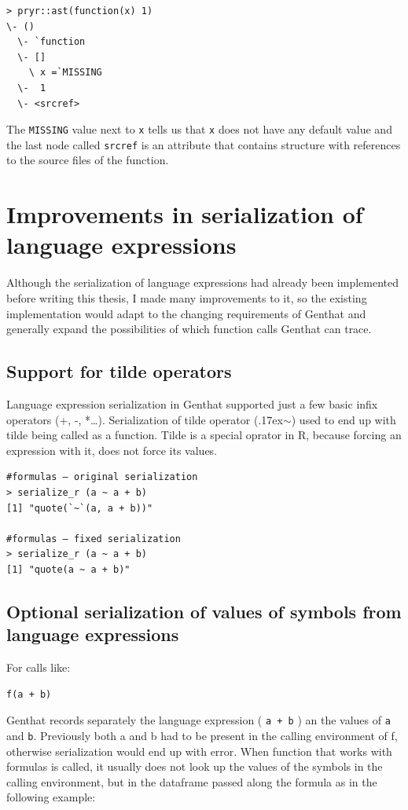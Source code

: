 \documentclass[thesis=B,english]{FITthesis}[2012/10/20]
\begin{document}
\begin{verbatim}
> pryr::ast(function(x) 1)
\- ()
  \- `function
  \- []
    \ x =`MISSING
  \-  1
  \- <srcref>
\end{verbatim}

The \verb|MISSING| value next to \verb|x| tells us that \verb|x| does not have any default value and the last node called \verb|srcref| is an attribute that contains structure with references to the source files of the function.

\section{Improvements in serialization of language expressions}
Although the serialization of language expressions had already been implemented before writing this thesis, I made many improvements to it, so the existing implementation would adapt to the changing requirements of Genthat and generally expand the possibilities of which function calls Genthat can trace.

\subsection{Support for tilde operators}
Language expression serialization in Genthat supported just a few basic infix operators (+, -, *…). Serialization of tilde operator ({\raise.17ex\hbox{$\scriptstyle\sim$}}) used to end up with tilde being called as a function. Tilde is a special oprator in R, because forcing an expression with it, does not force its values.

\begin{verbatim}
#formulas – original serialization
> serialize_r (a ~ a + b)
[1] "quote(`~`(a, a + b))"

#formulas – fixed serialization
> serialize_r (a ~ a + b)
[1] "quote(a ~ a + b)"
\end{verbatim}
    
\subsection{Optional serialization of values of symbols from language expressions}
For calls like:
\begin{verbatim}
f(a + b)
\end{verbatim}

Genthat records separately the language expression ( \verb|a + b| ) an the values of \verb|a| and \verb|b|. Previously both a and b had to be present in the calling environment of f, otherwise serialization would end up with error. When function that works with formulas is called, it usually does not look up the values of the symbols in the calling environment, but in the dataframe passed along the formula as in the following example:
\end{document}
